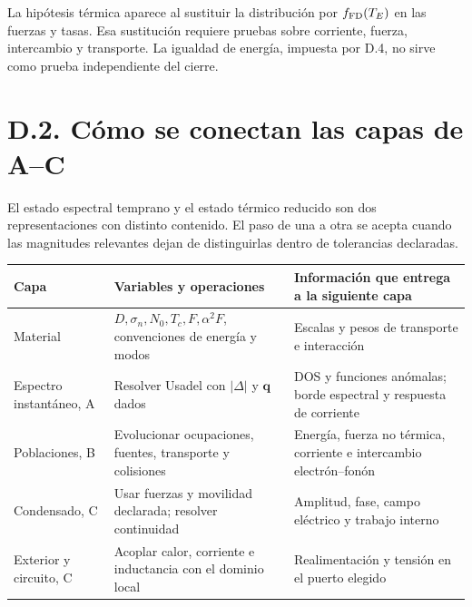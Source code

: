 \documentclass[
  spanish,
  10pt,
  a4paper,
]{article}
\newcounter{none} %
\begin{document}
La hipótesis térmica aparece al sustituir la distribución por
\(f_{\rm FD}(T_E)\) en las fuerzas y tasas. Esa sustitución requiere
pruebas sobre corriente, fuerza, intercambio y transporte. La igualdad
de energía, impuesta por D.4, no sirve como prueba independiente del
cierre.

\section{D.2. Cómo se conectan las capas de
A--C}\label{d.2.-cuxf3mo-se-conectan-las-capas-de-ac}

El estado espectral temprano y el estado térmico reducido son dos
representaciones con distinto contenido. El paso de una a otra se acepta
cuando las magnitudes relevantes dejan de distinguirlas dentro de
tolerancias declaradas.

{\def\LTcaptype{none} %
\begin{longtable}[]{@{}
  >{\raggedright\arraybackslash}p{}
  >{\raggedright\arraybackslash}p{}
  >{\raggedright\arraybackslash}p{}@{}}
\toprule\noalign{}
\begin{minipage}[b]{\linewidth}\raggedright
Capa
\end{minipage} & \begin{minipage}[b]{\linewidth}\raggedright
Variables y operaciones
\end{minipage} & \begin{minipage}[b]{\linewidth}\raggedright
Información que entrega a la siguiente capa
\end{minipage} \\
\midrule\noalign{}
\endhead
\bottomrule\noalign{}
\endlastfoot
Material & \(D,\sigma_n,N_0,T_c,F,\alpha^2F\), convenciones de energía y
modos & Escalas y pesos de transporte e interacción \\
Espectro instantáneo, A & Resolver Usadel con \(|\Delta|\) y
\(\mathbf q\) dados & DOS y funciones anómalas; borde espectral y
respuesta de corriente \\
Poblaciones, B & Evolucionar ocupaciones, fuentes, transporte y
colisiones & Energía, fuerza no térmica, corriente e intercambio
electrón--fonón \\
Condensado, C & Usar fuerzas y movilidad declarada; resolver continuidad
& Amplitud, fase, campo eléctrico y trabajo interno \\
Exterior y circuito, C & Acoplar calor, corriente e inductancia con el
dominio local & Realimentación y tensión en el puerto elegido \\
\end{longtable}
}
\end{document}
